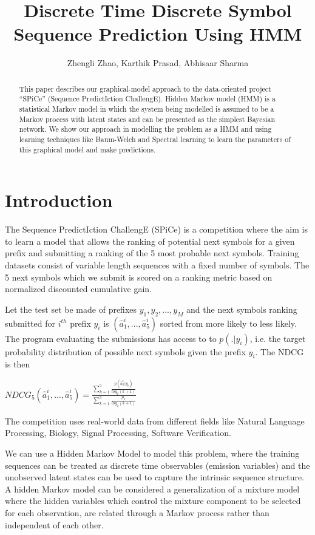 \documentclass[letterpaper]{article}
\title{Discrete Time Discrete Symbol Sequence Prediction Using HMM}
\author{Zhengli Zhao, Karthik Prasad, Abhisaar Sharma}
\begin{document}
\maketitle
\begin{abstract}
This paper describes our graphical-model approach to the data-oriented project “SPiCe” (Sequence PredictIction ChallengE). Hidden Markov model (HMM) is a statistical Markov model in which the system being modelled is assumed to be a Markov process with latent states and can be presented as the simplest Bayesian network. We show our approach in modelling the problem as a HMM and using learning techniques like Baum-Welch and Spectral learning to learn the parameters of this graphical model and make predictions.

\end{abstract}

\section{Introduction}
The Sequence PredictIction ChallengE (SPiCe) is a competition where the aim is to learn a model that allows the ranking of potential next symbols for a given prefix and submitting a ranking of the 5 most probable next symbols. Training datasets consist of variable length sequences with a fixed number of symbols. The 5 next symbols which we submit is scored on a ranking metric based on normalized discounted cumulative gain.

Let the test set be made of prefixes $y_{1},y_{2},..., y_{M}$ and the next symbols ranking submitted for $i^{th}$ prefix $y_{i}$ is $(\hat{a}^{i}_{1},...,\hat{a}^{i}_{5})$ sorted from more likely to less likely. The program evaluating the submissions has access to to $p(.|y_{i})$, i.e. the target probability distribution of possible next symbols given the prefix $y_{i}$. The NDCG is then
\begin{center}
$\displaystyle NDCG_{5}(\hat{a}^{i}_{1},...,\hat{a}^{i}_{5}) = \frac{\sum_{k=1}^{5}\frac{p(\hat{a}_{k}^{i}| y_{i})}{log_{2}(k+1)}}{\sum_{k=1}^{5}\frac{p_{k}}{log_{2}(k+1)}} $  
\end{center}

The competition uses real-world data from different fields like Natural Language Processing, Biology, Signal Processing, Software Verification. 

We can use a Hidden Markov Model to model this problem, where the training sequences can be treated as discrete time observables (emission variables) and the unobserved latent states can be used to capture the intrinsic sequence structure. A hidden Markov model can be considered a generalization of a mixture model where the hidden variables which control the mixture component to be selected for each observation, are related through a Markov process rather than independent of each other. 
\end{document}

